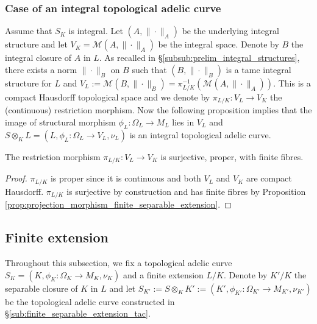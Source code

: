 \documentclass [11pt,reqno]{amsart}
\newcommand{\1}{\mathmybb{1}}
\def\cM{{\mathcal{M}}}
\begin{document}
\subsubsection{Case of an integral topological adelic curve}

Assume that $S_K$ is integral. Let $(A,\|\cdot\|_A)$ be the underlying integral structure and let $V_K=\cM(A,\|\cdot\|_A)$ be the integral space. Denote by $B$ the integral closure of $A$ in $L$. As recalled in \S \ref{subsub:prelim_integral_structures}, there exists a norm $\|\cdot\|_B$ on $B$ such that $(B,\|\cdot\|_B)$ is a tame integral structure for $L$ and $V_L := \cM(B,\|\cdot\|_B) = \pi_{L/K}^{-1}(\cM(A,\|\cdot\|_{A}))$. This is a compact Hausdorff topological space and we denote by $\pi_{L/K} : V_L \to V_K$ the (continuous) restriction morphism. Now the following proposition implies that the image of structural morphism $\phi_L : \Omega_L \to M_L$ lies in $V_L$ and $S \otimes_{K} L = (L,\phi_L : \Omega_L \to V_L,\nu_L)$ is an integral topological adelic curve.

\begin{proposition}
\label{prop:projection_morphism_finite_separable_extension_integral}
The restriction morphism $\pi_{L/K} : V_L \to V_K$ is surjective, proper, with finite fibres.
\end{proposition}

\begin{proof}
$\pi_{L/K}$ is proper since it is continuous and both $V_L$ and $V_K$ are compact Hausdorff. $\pi_{L/K}$ is surjective by construction and has finite fibres by Proposition \ref{prop:projection_morphism_finite_separable_extension}.
\end{proof}

\subsection{Finite extension}
\label{sub:finite_extension_tac}

Throughout this subsection, we fix a topological adelic curve $S_{K}=(K,\phi_K : \Omega_K \to M_K,\nu_K)$ and a finite extension $L/K$. Denote by $K'/K$ the separable closure of $K$ in $L$ and let $S_{K'} := S \otimes_K K' := (K',\phi_{K'}:\Omega_{K'}\to M_{K'},\nu_{K'})$ be the topological adelic curve constructed in \S \ref{sub:finite_separable_extension_tac}. 
\end{document}
